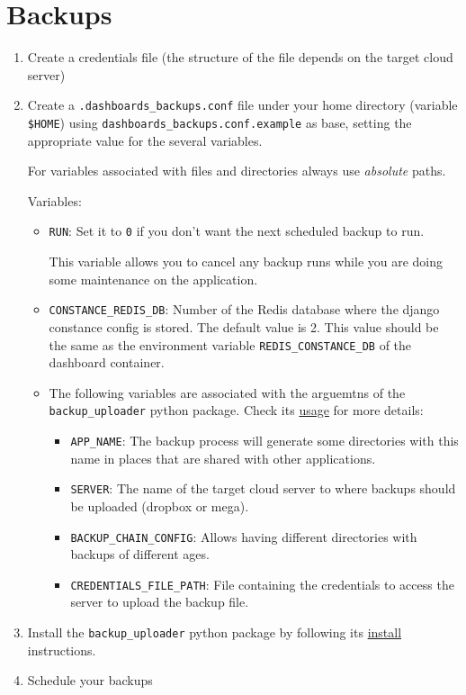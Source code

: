 \documentclass[
]{book}
\begin{document}
\hypertarget{backups}{%
\chapter{Backups}\label{backups}}

\begin{enumerate}
\def\labelenumi{\arabic{enumi}.}
\item
  Create a credentials file (the structure of the file depends on the target cloud server)
\item
  Create a \texttt{.dashboards\_backups.conf} file under your home directory (variable \texttt{\$HOME}) using \texttt{dashboards\_backups.conf.example} as base, setting the appropriate value for the several variables.

  For variables associated with files and directories always use \emph{absolute} paths.

  Variables:

  \begin{itemize}
  \item
    \texttt{RUN}: Set it to \texttt{0} if you don't want the next scheduled backup to run.

    This variable allows you to cancel any backup runs while you are doing some maintenance on the application.
  \item
    \texttt{CONSTANCE\_REDIS\_DB}: Number of the Redis database where the django constance config is stored. The default value is 2. This value should be the same as the environment variable \texttt{REDIS\_CONSTANCE\_DB} of the dashboard container.
  \item
    The following variables are associated with the arguemtns of the \texttt{backup\_uploader} python package. Check its \href{https://github.com/aspedrosa/BackupUploader\#usage}{usage} for more details:

    \begin{itemize}
    \item
      \texttt{APP\_NAME}: The backup process will generate some directories with this name in places that are shared with other applications.
    \item
      \texttt{SERVER}: The name of the target cloud server to where backups should be uploaded (dropbox or mega).
    \item
      \texttt{BACKUP\_CHAIN\_CONFIG}: Allows having different directories with backups of different ages.
    \item
      \texttt{CREDENTIALS\_FILE\_PATH}: File containing the credentials to access the server to upload the backup file.
    \end{itemize}
  \end{itemize}
\item
  Install the \texttt{backup\_uploader} python package by following its \href{https://github.com/aspedrosa/BackupUploader\#install}{install} instructions.
\item
  Schedule your backups


\end{enumerate}
\end{document}
